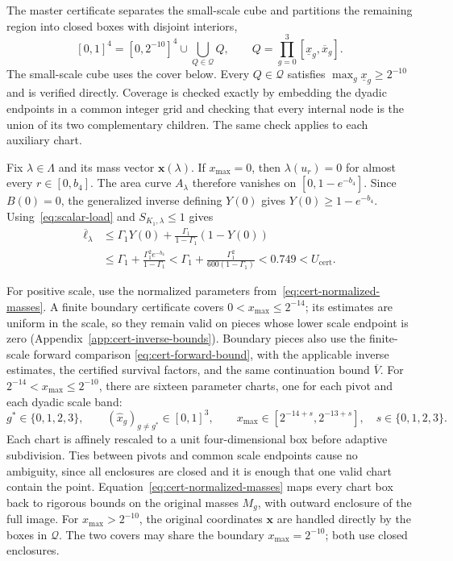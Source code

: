 \documentclass[11pt]{article}
\theoremstyle{definition}
\theoremstyle{remark}
\begin{document}
The master certificate separates the small-scale cube and partitions
the remaining region into closed boxes with disjoint interiors,
\begin{equation}\label{eq:cert-global-partition}
 [0,1]^4=[0,2^{-10}]^4\cup\bigcup_{Q\in\mathcal Q} Q,
 \qquad Q=\prod_{g=0}^3[\underline x_g,\overline x_g].
\end{equation}
The small-scale cube uses the cover below.  Every $Q\in\mathcal Q$
satisfies $\max_g\underline x_g\ge2^{-10}$ and is verified directly.
Coverage is checked exactly by embedding the dyadic endpoints in a
common integer grid and checking that every internal node is the union
of its two complementary children.  The same check applies to each
auxiliary chart.

Fix $\lambda\in\Lambda$ and its mass vector $\mathbf x(\lambda)$.
If $x_{\max}=0$, then $\lambda(u_r)=0$ for almost every
$r\in[0,b_4]$.  The area curve $A_\lambda$ therefore vanishes on
$[0,1-e^{-b_4}]$.  Since $B(0)=0$, the generalized inverse defining
$Y(0)$ gives $Y(0)\ge1-e^{-b_4}$.
Using~\eqref{eq:scalar-load} and $S_{K_1,\lambda}\le1$ gives
\begin{equation}\label{eq:cert-zero-scale}
 \begin{aligned}
 \overline\ell_\lambda
 &\le\Gamma_1Y(0)+\frac{\Gamma_1}{1-\Gamma_1}(1-Y(0))\\
 &\le\Gamma_1+\frac{\Gamma_1^2e^{-b_4}}{1-\Gamma_1}
 <\Gamma_1+\frac{\Gamma_1^2}{600(1-\Gamma_1)}
 <0.749<U_{\mathrm{cert}}.
 \end{aligned}
\end{equation}

For positive scale, use the normalized parameters
from~\eqref{eq:cert-normalized-masses}.
A finite boundary certificate covers
$
0<x_{\max}\le2^{-14}$; its estimates are uniform in the scale, so they remain valid on pieces whose lower scale endpoint is zero (Appendix~\ref{app:cert-inverse-bounds}).
Boundary pieces also use the finite-scale forward comparison
\eqref{eq:cert-forward-bound}, with the applicable inverse estimates,
the certified survival factors, and the same continuation bound
$\overline V$.
For $2^{-14}<x_{\max}\le2^{-10}$, there are sixteen parameter charts, one for each pivot and each dyadic scale band:
\begin{equation}\label{eq:cert-scale-charts}
 g^*\in\{0,1,2,3\},\qquad
 (\hat x_g)_{g\ne g^*}\in[0,1]^3,\qquad
 x_{\max}\in[2^{-14+s},2^{-13+s}],\quad s\in\{0,1,2,3\}.
\end{equation}
Each chart is affinely rescaled to a unit
four-dimensional box before adaptive subdivision.  Ties between pivots
and common scale endpoints cause no ambiguity, since all enclosures are
closed and it is enough that one valid chart contain the point.
Equation~\eqref{eq:cert-normalized-masses} maps every chart box back to
rigorous bounds on the original masses $M_g$, with outward enclosure of
the full image.
For $x_{\max}>2^{-10}$, the original coordinates $\mathbf x$ are
handled directly by the boxes in $\mathcal Q$.
The two covers may share the boundary $x_{\max}=2^{-10}$; both use
closed enclosures.
\end{document}
